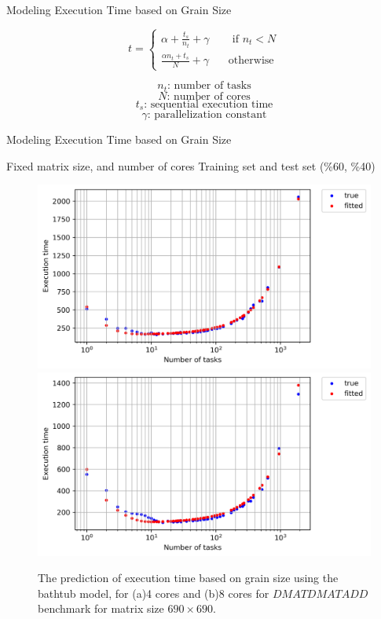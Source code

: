 \documentclass[10pt]{beamer}
\begin{document}
\begin{frame}{Modeling Execution Time based on Grain Size}
\begin{outline}		
	$$t=\left\{
	\begin{aligned}
		\alpha+\frac{t_s}{n_t}+\gamma  \:\:\:\:\:\:\:\:      \text{ if } n_t<N\\
		\frac{\alpha{n_t}+t_s}{N}+\gamma\:\:\:\:\:\:\:\:     \text{otherwise}
	\end{aligned}
	\right.$$

	$$n_t \text{: number of tasks}	$$
	$$N\text{: number of cores}$$
	$$t_s\text{: sequential execution time}$$
	$$\gamma\text{: parallelization constant}$$

\end{outline}
\end{frame}

\begin{frame}{Modeling Execution Time based on Grain Size}
\begin{outline}	
	\1Fixed matrix size, and number of cores	
	\1Training set and test set (\%60, \%40)
	\begin{figure}[H]
		\centering
		{\includegraphics[scale=.4]{images/bathtub/pred/pred_690_4.png}\label{fig22:a}}
		{\includegraphics[scale=.4]{images/bathtub/pred/pred_690_8.png}\label{fig22:b}}	
		\caption{The prediction of execution time based on grain size using the bathtub model, for (a)4 cores and (b)8 cores for $DMATDMATADD$ benchmark for matrix size $690\times690$.}	
		\label{fig22}
	\end{figure}
\end{outline}
\end{frame}
\end{document}
